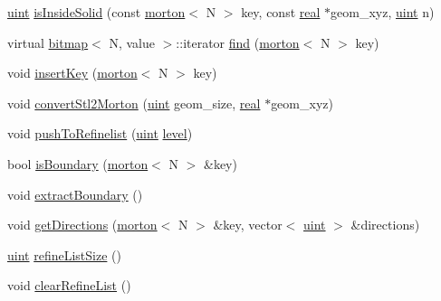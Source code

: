 \begin{DoxyCompactItemize}
\item 
\mbox{\hyperlink{definitions_8h_a69aa29b598b851b0640aa225a9e5d61d}{uint}} \mbox{\hyperlink{classTree_a2ef8077c21a8972b1ea126ec2fb9d4a5}{is\+Inside\+Solid}} (const \mbox{\hyperlink{definitions_8h_af8682350bd8bb38ee9023f7a0a310add}{morton}}$<$ N $>$ key, const \mbox{\hyperlink{definitions_8h_aedc0ad84d1e764530814f57ad931d02a}{real}} $\ast$geom\+\_\+xyz, \mbox{\hyperlink{definitions_8h_a69aa29b598b851b0640aa225a9e5d61d}{uint}} n)
\item 
virtual \mbox{\hyperlink{definitions_8h_acf2396ef4de9eb8a6324b9f1a624ea85}{bitmap}}$<$ N, value $>$\+::iterator \mbox{\hyperlink{classTree_a8337d6639f90ef96e4d42e1cbfab61dd}{find}} (\mbox{\hyperlink{definitions_8h_af8682350bd8bb38ee9023f7a0a310add}{morton}}$<$ N $>$ key)
\item 
void \mbox{\hyperlink{classTree_a5636d1c76405db54820d900909161987}{insert\+Key}} (\mbox{\hyperlink{definitions_8h_af8682350bd8bb38ee9023f7a0a310add}{morton}}$<$ N $>$ key)
\item 
void \mbox{\hyperlink{classTree_a799cfd84de5609b6a89284f116f03cfd}{convert\+Stl2\+Morton}} (\mbox{\hyperlink{definitions_8h_a69aa29b598b851b0640aa225a9e5d61d}{uint}} geom\+\_\+size, \mbox{\hyperlink{definitions_8h_aedc0ad84d1e764530814f57ad931d02a}{real}} $\ast$geom\+\_\+xyz)
\item 
void \mbox{\hyperlink{classTree_a9ba1d0e46c90f677fb33480f3061624b}{push\+To\+Refinelist}} (\mbox{\hyperlink{definitions_8h_a69aa29b598b851b0640aa225a9e5d61d}{uint}} \mbox{\hyperlink{classTree_a01f065cafedac5e2845e9d17bf87b783}{level}})
\item 
bool \mbox{\hyperlink{classTree_a48d8a704bb776cb9720e53b4e849abc5}{is\+Boundary}} (\mbox{\hyperlink{definitions_8h_af8682350bd8bb38ee9023f7a0a310add}{morton}}$<$ N $>$ \&key)
\item 
void \mbox{\hyperlink{classTree_afe37f37ae3c392c4df2abdf07dd7c5a3}{extract\+Boundary}} ()
\item 
void \mbox{\hyperlink{classTree_affd94b8b250ab921a02f987977c0b14c}{get\+Directions}} (\mbox{\hyperlink{definitions_8h_af8682350bd8bb38ee9023f7a0a310add}{morton}}$<$ N $>$ \&key, vector$<$ \mbox{\hyperlink{definitions_8h_a69aa29b598b851b0640aa225a9e5d61d}{uint}} $>$ \&directions)
\item 
\mbox{\hyperlink{definitions_8h_a69aa29b598b851b0640aa225a9e5d61d}{uint}} \mbox{\hyperlink{classTree_a214243106c17c81d193834cfeb7dfd85}{refine\+List\+Size}} ()
\item 
void \mbox{\hyperlink{classTree_ad047a737bb54fe039333c284f80994df}{clear\+Refine\+List}} ()

\end{DoxyCompactItemize}
